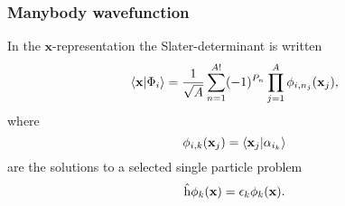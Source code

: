 \begin{frame}[fragile]
    \frametitle{Manybody wavefunction}
    In the $\mathbf{x}$-representation the Slater-determinant is written
    \begin{equation*}
        \langle \mathbf{x} | \Phi_i \rangle = \frac{1}{\sqrt{A}} \sum_{n=1}^{A!} (-1)^{P_n} \prod_{j=1}^A \phi_{i,n_j}(\mathbf{x}_j),
    \end{equation*}
    where
    \begin{equation*}
        \phi_{i,k} (\mathbf{x}_j) = \langle \mathbf{x}_j | \alpha_{i_k} \rangle
    \end{equation*}
    are the solutions to a selected single particle problem
    \begin{equation*}
        \hat{\mathrm{h}} \phi_k(\mathbf{x}) = \epsilon_k \phi_k(\mathbf{x}).
    \end{equation*}
\end{frame}
